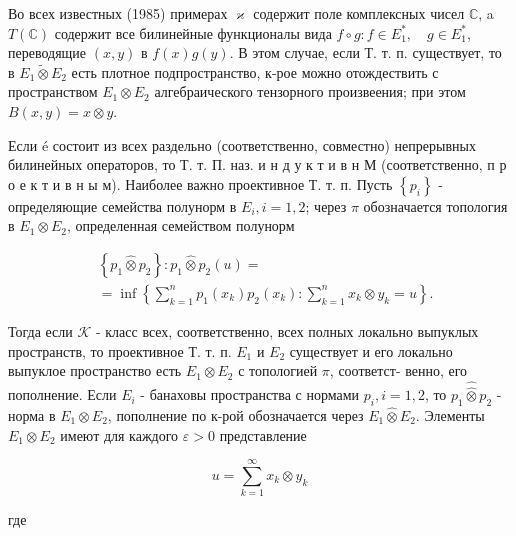 \documentclass[10pt]{article}
\begin{document}
Во всех известных (1985) примерах $\mathscr{\varkappa}$ содержит поле комплексных чисел $\mathbb{C}$, a $T(\mathbb{C})$ содержит все билинейные функционалы вида $f \circ g: f \in E_{1}^{*}, \quad g \in E_{1}^{*}$, переводящие $(x, y)$ в $f(x) g(y)$. В этом случае, если Т. т. п. существует, то в $E_{1} \tilde{\otimes} E_{2}$ есть плотное подпространство, к-рое можно отождествить с пространством $E_{1} \otimes E_{2}$ алгебраического тензорного произвеения; при этом $B(x, y)=x \otimes y$.



Если é состоит из всех раздельно (соответственно, совместно) непрерывных билинейных операторов, то Т. т. П. наз. и н д у к т и в н М (соответственно, п р о е к т и в н ы м). Наиболее важно проективное Т. т. п. Пусть $\left\{p_{i}\right\}$ - определяющие семейства полунорм в $E_{i}, i=1,2$; через $\pi$ обозначается топология в $E_{1} \otimes E_{2}$, определенная семейством полунорм



\[

\begin{aligned}

& \left\{p_{1} \widehat{\otimes} p_{2}\right\}: p_{1} \widehat{\otimes} p_{2}(u)= \\

& =\inf \left\{\sum_{k=1}^{n} p_{1}\left(x_{k}\right) p_{2}\left(x_{k}\right): \sum_{k=1}^{n} x_{k} \otimes y_{k}=u\right\} .

\end{aligned}

\]



Тогда если $\mathscr{K}$ - класс всех, соответственно, всех полных локально выпуклых пространств, то проективное Т. т. п. $E_{1}$ и $E_{2}$ существует и его локально выпуклое пространство есть $E_{1} \otimes E_{2}$ с топологией $\pi$, соответст- венно, его пополнение. Если $E_{i}$ - банаховы пространства с нормами $p_{i}, i=1,2$, то $p_{1} \widehat{\widehat{\otimes}} p_{2}$ - норма в $E_{1} \otimes E_{2}$, пополнение по к-рой обозначается через $E_{1} \widehat{\otimes} E_{2}$. Элементы $E_{1} \otimes E_{2}$ имеют для каждого $\varepsilon>0$ представление



\[

u=\sum_{k=1}^{\infty} x_{k} \otimes y_{k}

\]



где
\end{document}
